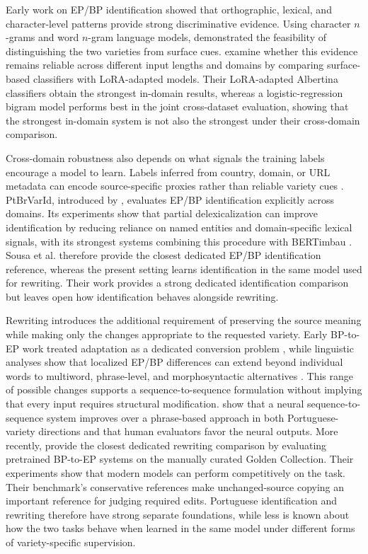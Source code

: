 \documentclass[acmtog,nonacm]{acmart}
\begin{document}
Early work on EP/BP identification showed that orthographic, lexical, and
character-level patterns provide strong discriminative evidence. Using
character \(n\)-grams and word \(n\)-gram language models,
\citet{DBLP:conf/konvens/ZampieriG12} demonstrated the feasibility of
distinguishing the two varieties from surface cues. \citet{preda-etal-2024-across} examine whether this evidence remains reliable
across different input lengths and domains by comparing surface-based
classifiers with LoRA-adapted models. Their LoRA-adapted Albertina classifiers
obtain the strongest in-domain results, whereas a logistic-regression bigram
model performs best in the joint cross-dataset evaluation, showing that the
strongest in-domain system is not also the strongest under their cross-domain
comparison.

Cross-domain robustness also depends on what signals the training labels
encourage a model to learn. Labels inferred from country, domain, or URL
metadata can encode source-specific proxies rather than reliable variety cues
\citep{zampieri-etal-2014-report}. PtBrVarId, introduced by
\citet{Sousa_Almeida_Silvano_Cantante_Campos_Jorge_2025}, evaluates EP/BP
identification explicitly across domains. Its experiments show that partial
delexicalization can improve identification by reducing reliance on named
entities and domain-specific lexical signals, with its strongest systems
combining this procedure with BERTimbau \citep{souza2020bertimbau}. Sousa
et al. therefore provide the closest dedicated EP/BP identification reference,
whereas the present setting learns identification in the same model used for
rewriting. Their work provides a strong dedicated identification comparison but leaves open how identification behaves alongside rewriting.

Rewriting introduces the additional requirement of preserving the source
meaning while making only the changes appropriate to the requested variety.
Early BP-to-EP work treated adaptation as a dedicated conversion problem
\citep{marujo-etal-2011-bp2ep}, while linguistic analyses show that localized
EP/BP differences can extend beyond individual words to multiword,
phrase-level, and morphosyntactic alternatives
\citep{barreiro-mota-2018-paraphrastic}. This range of possible changes
supports a sequence-to-sequence formulation without implying that every input
requires structural modification. \citet{costa-jussa-etal-2018-neural} show
that a neural sequence-to-sequence system improves over a phrase-based approach
in both Portuguese-variety directions and that human evaluators favor the
neural outputs. More recently,
\citet{sanches2024brazilianportugueseeuropeanportuguese} provide the closest
dedicated rewriting comparison by evaluating pretrained BP-to-EP systems on the
manually curated Golden Collection. Their experiments show that modern models
can perform competitively on the task. Their benchmark's conservative
references make unchanged-source copying an important reference for judging
required edits. Portuguese identification and
rewriting therefore have strong separate foundations, while less is known
about how the two tasks behave when learned in the same model under different
forms of variety-specific supervision.
\end{document}
